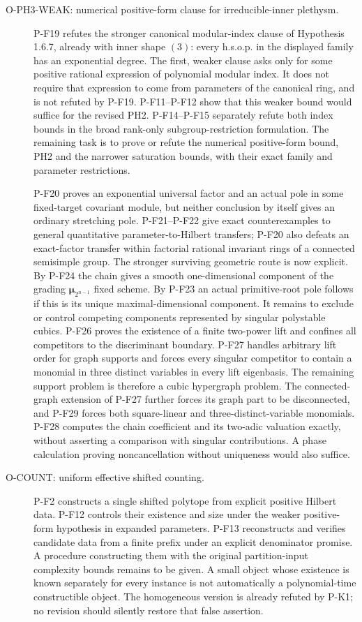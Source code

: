 \documentclass[11pt,a4paper]{article}
\begin{document}
\begin{description}
\item[O-PH3-WEAK: numerical positive-form clause for irreducible-inner plethysm.]
P-F19 refutes the stronger canonical modular-index clause of
Hypothesis 1.6.7, already with inner shape $(3)$: every h.s.o.p.
in the displayed family has an exponential degree. The first,
weaker clause asks only for some positive rational expression of
polynomial modular index. It does not require that expression to
come from parameters of the canonical ring, and is not refuted by
P-F19. P-F11--P-F12 show that this weaker bound would suffice for
the revised PH2. P-F14--P-F15 separately refute both index bounds
in the broad rank-only subgroup-restriction formulation. The
remaining task is to prove or refute the numerical positive-form
bound, PH2 and the narrower saturation bounds, with their exact
family and parameter restrictions.

P-F20 proves an exponential universal factor and an actual pole in
some fixed-target covariant module, but neither conclusion by itself
gives an ordinary stretching pole. P-F21--P-F22 give exact
counterexamples to general quantitative parameter-to-Hilbert
transfers; P-F20 also defeats an exact-factor transfer within
factorial rational invariant rings of a connected semisimple group.
The stronger surviving geometric route is now explicit. By P-F24
the chain gives a smooth one-dimensional component of the grading
$\boldsymbol\mu_{2^{n-1}}$ fixed scheme. By P-F23 an actual
primitive-root pole follows if this is its unique maximal-dimensional
component. It remains to exclude or control competing components
represented by singular polystable cubics. P-F26 proves the existence
of a finite two-power lift and confines all competitors to the
discriminant boundary. P-F27 handles arbitrary lift order for graph
supports and forces every singular competitor to contain a monomial
in three distinct variables in every lift eigenbasis. The remaining
support problem is therefore a cubic hypergraph problem. The
connected-graph extension of P-F27 further forces its graph part
to be disconnected, and P-F29 forces both square-linear and
three-distinct-variable monomials. P-F28 computes the chain
coefficient and its two-adic valuation exactly, without asserting
a comparison with singular contributions. A phase
calculation proving noncancellation without uniqueness would also suffice.

\item[O-COUNT: uniform effective shifted counting.]
P-F2 constructs a single shifted polytope from explicit positive Hilbert
data. P-F12 controls their existence and size under the weaker
positive-form hypothesis in expanded parameters. P-F13 reconstructs
and verifies candidate data from a finite prefix under an explicit
denominator promise. A procedure constructing them with the original
partition-input complexity bounds remains to be given. A small object
whose existence is known separately for every instance is not automatically
a polynomial-time constructible object. The homogeneous version is already
refuted by P-K1; no revision should silently restore that false assertion.


\end{description}
\end{document}
